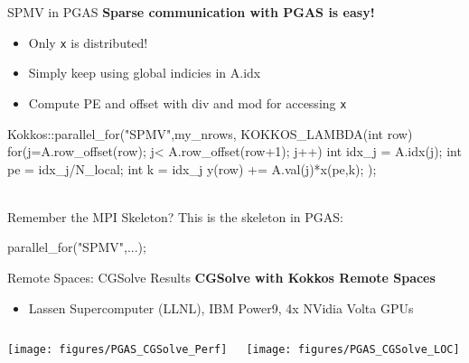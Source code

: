 
\begin{frame}[fragile]{SPMV in PGAS}
  \textbf{Sparse communication with PGAS is easy!}
  \begin{itemize}
    \item Only \texttt{x} is distributed!
    \item Simply keep using global indicies in A.idx
    \item Compute PE and offset with div and mod for accessing \texttt{x}
  \end{itemize}

  \begin{code}[keywords={for,MPI_Irecv,MPI_Isend,MPI_Waitall,parallel_for,fence, Kokkos}]
  Kokkos::parallel_for("SPMV",my_nrows, KOKKOS_LAMBDA(int row) {
    for(j=A.row_offset(row); j< A.row_offset(row+1); j++) {
      int idx_j = A.idx(j);
      int pe = idx_j/N_local;
      int k = idx_j%
      y(row) += A.val(j)*x(pe,k);
    }
  });
  \end{code}\\
  Remember the MPI Skeleton? This is the skeleton in PGAS:
  \begin{code}
    parallel_for("SPMV",...);
  \end{code}
\end{frame}


\begin{frame}{Remote Spaces: CGSolve Results}
  \textbf{CGSolve with Kokkos Remote Spaces}
  \vspace{5pt}
  \begin{itemize}
    \item\small Lassen Supercomputer (LLNL), IBM Power9, 4x NVidia Volta GPUs
  \end{itemize}
  \begin{columns}[t,onlytextwidth]
    \begin{center}
      \texttt{[image: figures/PGAS\_CGSolve\_Perf]}
    \end{center}
    \begin{center}
      \texttt{[image: figures/PGAS\_CGSolve\_LOC]}
    \end{center}
  \end{columns}
\end{frame}

